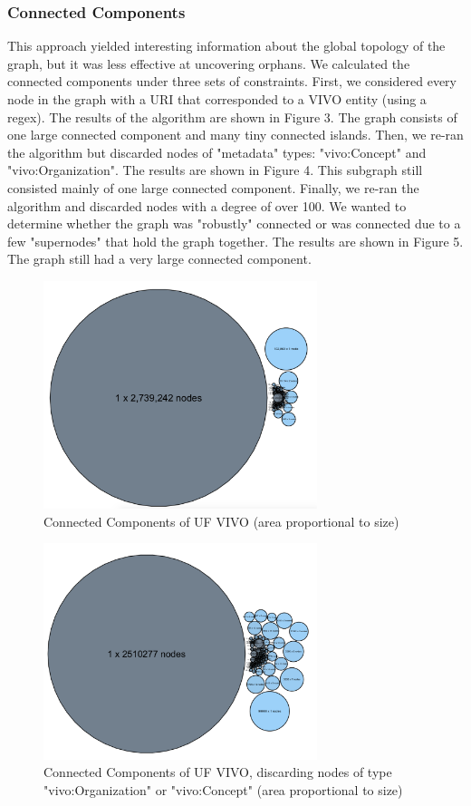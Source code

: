 \documentclass[11pt]{article}
\begin{document}
\subsubsection*{Connected Components}
This approach yielded interesting information about the global topology of the graph, but it was less effective at uncovering orphans. We calculated the connected components under three sets of constraints. First, we considered every node in the graph with a URI that corresponded to a VIVO entity (using a regex). The results of the algorithm are shown in Figure 3. The graph consists of one large connected component and many tiny connected islands. Then, we re-ran the algorithm but discarded nodes of "metadata" types: "vivo:Concept" and "vivo:Organization". The results are shown in Figure 4. This subgraph still consisted mainly of one large connected component. Finally, we re-ran the algorithm and discarded nodes with a degree of over 100. We wanted to determine whether the graph was "robustly" connected or was connected due to a few "supernodes" that hold the graph together. The results are shown in Figure 5. The graph still had a very large connected component.

\begin{figure}[h!]
\centering
\includegraphics[width=8cm]{cc-actual.png}
\caption{Connected Components of UF VIVO (area proportional to size)}
\label{fig:output}
\end{figure}

\begin{figure}[h!]
\centering
\includegraphics[width=8cm]{cc-2.png}
\caption{Connected Components of UF VIVO, discarding nodes of type "vivo:Organization" or "vivo:Concept" (area proportional to size)}
\label{fig:output}
\end{figure}
\end{document}
